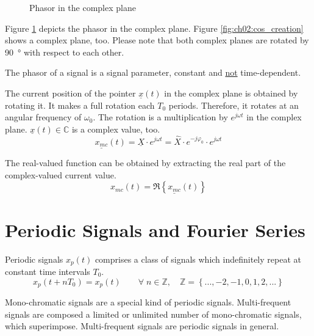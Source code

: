 \begin{refsection}
\begin{figure}[H]
	\caption{Phasor in the complex plane}
	\label{fig:ch02:cmplxplane_phasor}
\end{figure}

Figure \ref{fig:ch02:cmplxplane_phasor} depicts the phasor in the complex plane. Figure \ref{fig:ch02:cos_creation} shows a complex plane, too. Please note that both complex planes are rotated by \SI{90}{\degree} with respect to each other.

\begin{fact}
	The phasor of a signal is a signal parameter, constant and \underline{not} time-dependent.
\end{fact}

The current position of the pointer $\underline{x}(t)$ in the complex plane is obtained by rotating it. It makes a full rotation each $T_0$ periods. Therefore, it rotates at an angular frequency of $\omega_0$. The rotation is a multiplication by $e^{j \omega t}$ in the complex plane. $\underline{x}(t) \in \mathbb{C}$ is a complex value, too.
\begin{equation}
	\underline{x_{mc}}(t) = \underline{X} \cdot e^{j \omega t} = \hat{X} \cdot e^{-j \varphi_0} \cdot e^{j \omega t}
\end{equation}


The real-valued function can be obtained by extracting the real part of the complex-valued current value.
\begin{equation}
	x_{mc}(t) = \Re\left\{\underline{x_{mc}}(t)\right\}
\end{equation}

\section{Periodic Signals and Fourier Series}

Periodic signals $x_p(t)$ comprises a class of signals which indefinitely repeat at constant time intervals $T_0$.
\begin{equation}
	x_p(t + n T_0) = x_p(t) \qquad \forall \; n \in \mathbb{Z}, \quad \mathbb{Z} = \left\{..., -2, -1, 0, 1, 2, ...\right\}
\end{equation}

Mono-chromatic signals are a special kind of periodic signals. Multi-frequent signals are composed a limited or unlimited number of mono-chromatic signals, which superimpose. Multi-frequent signals are periodic signals in general.


\end{refsection}
